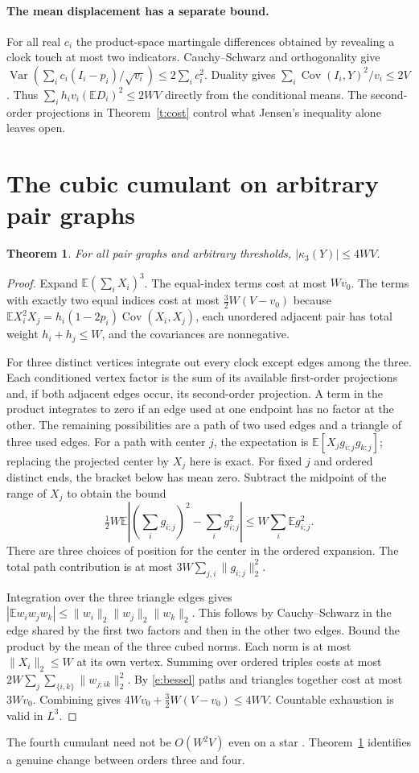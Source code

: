 \documentclass[11pt]{article}
\newtheorem{theorem}{Theorem}[section]
\newcommand{\E}{\mathbb E}
\newcommand{\Var}{\operatorname{Var}}
\newcommand{\Cov}{\operatorname{Cov}}
\numberwithin{equation}{section}
\begin{document}
\paragraph{The mean displacement has a separate bound.}
For all real $c_i$ the product-space martingale differences obtained by revealing a
clock touch at most two indicators. Cauchy--Schwarz and orthogonality give
$\Var(\sum_i c_i (I_i-p_i)/\sqrt{v_i})\le2\sum_i c_i^2$.
Duality gives $\sum_i\Cov(I_i,Y)^2/v_i\le2V$. Thus
$\sum_i h_i v_i(\E D_i)^2\le2WV$ directly from the conditional means.
The second-order projections in Theorem~\ref{t:cost} control what Jensen's inequality
alone leaves open.

\section{The cubic cumulant on arbitrary pair graphs}
\begin{theorem}\label{t:cubic}
For all pair graphs and arbitrary thresholds, $|\kappa_3(Y)|\le4WV$.
\end{theorem}
\begin{proof}
Expand $\E(\sum_i X_i)^3$. The equal-index terms cost at most $Wv_0$.
The terms with exactly two equal indices cost at most $\tfrac32 W(V-v_0)$ because
$\E X_i^2X_j=h_i(1-2p_i)\Cov(X_i,X_j)$, each unordered adjacent pair has total weight $h_i+h_j\le W$, and the covariances are nonnegative.

For three distinct vertices integrate out every clock except edges among the
three. Each conditioned vertex factor is the sum of its available first-order
projections and, if both adjacent edges occur, its second-order projection.
A term in the product integrates to zero if an edge used at one endpoint has
no factor at the other. The remaining possibilities are a path of two used edges
and a triangle of three used edges. For a path with center $j$, the expectation is
$\E[X_jg_{i;j}g_{k;j}]$; replacing the projected center by $X_j$ here is exact.
For fixed $j$ and ordered distinct ends, the bracket below has mean zero. Subtract the midpoint of the range of $X_j$ to obtain the bound
\[
 \tfrac12 W\E\left|(\sum_i g_{i;j})^2-\sum_i g_{i;j}^2\right|
 \le W\sum_i\E g_{i;j}^2 .
\]
There are three choices of position for the center in the ordered expansion.
The total path contribution is at most $3W\sum_{j,i}\|g_{i;j}\|_2^2$.

Integration over the three triangle edges gives
$|\E w_i w_j w_k|\le\|w_i\|_2\|w_j\|_2\|w_k\|_2$.
This follows by Cauchy--Schwarz in the edge shared by the first two factors
and then in the other two edges. Bound the product by the mean of the three cubed
norms. Each norm is at most $\|X_i\|_2\le W$ at its own vertex.
Summing over ordered triples costs at most $2W\sum_j\sum_{\{i,k\}}\|w_{j;ik}\|_2^2$. By \eqref{e:bessel} paths and triangles together cost at most $3Wv_0$.
Combining gives $4Wv_0+\tfrac32W(V-v_0)\le4WV$. Countable exhaustion is valid in $L^3$.
\end{proof}
The fourth cumulant need not be $O(W^2V)$ even on a star \cite{previous}.
Theorem~\ref{t:cubic} identifies a genuine change between orders three and four.
\end{document}
